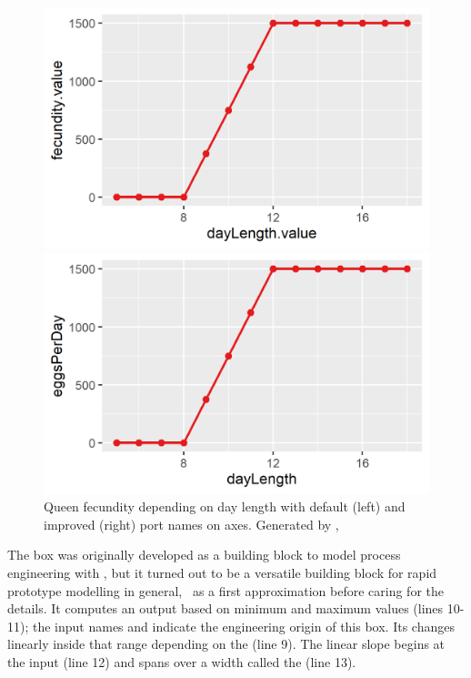 \begin{figure} [b]
  \centering
  \begin{minipage}[b]{0.45\textwidth}
    \includegraphics[width=\textwidth]{graphics/honeybee1-1}
  \end{minipage}
  \begin{minipage}[b]{0.45\textwidth}
    \includegraphics[width=\textwidth]{graphics/honeybee1-2}
  \end{minipage}
  \caption{Queen fecundity depending on day length with default (left) and improved (right) port names on axes. Generated by ,}
  \label{fig:honeybee1}
\end{figure}

The  box was originally developed as a building block to model process engineering with \US, but it turned out to be a versatile building block for rapid prototype modelling in general, \ie\ as a first approximation before caring for the details. It computes an output  based on minimum and maximum values (lines 10-11); the input names  and  indicate  the engineering origin of this box. Its  changes linearly inside that range depending on the  (line 9). The linear slope begins at the input  (line 12) and spans over a width called the  (line 13).

